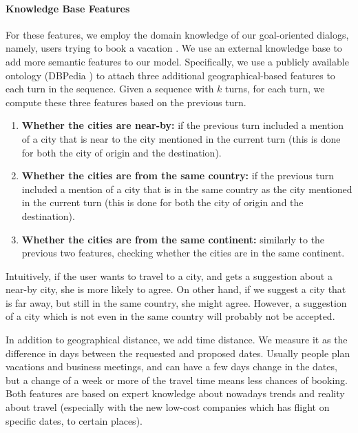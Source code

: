 \paragraph*{Knowledge Base Features}\label{sec:kb}
For these features, we employ the domain knowledge of our goal-oriented dialogs, 
namely, users trying to book a vacation \cite{frames}. 
We use an external knowledge base to add more semantic features to our model. 
Specifically, we use a publicly available ontology (DBPedia \cite{dbpedia}) 
to attach three additional geographical-based features to each turn in the sequence. 
Given a sequence with $k$ turns, for each turn, we compute these three features 
based on the previous turn. 

\begin{enumerate}
\item {\bf Whether the cities are near-by: } if the previous turn included a mention of a city that is near to the city mentioned in the current turn (this is done for both the city of origin and the destination).
\item {\bf Whether the cities are from the same country: } if the previous turn included a mention of a city that is in the same country as the city mentioned in the current turn (this is done for both the city of origin and the destination).
\item {\bf Whether the cities are from the same continent: } similarly to the previous two features, checking whether the cities are in the same continent.
\end{enumerate}

Intuitively, if the user wants to travel to a city, 
and gets a suggestion about a near-by city, 
she is more likely to agree. 
On other hand, if we suggest a city that is far away, 
but still in the same country, she might agree. 
However, a suggestion of a city which is not even 
in the same country will probably not be accepted. 

In addition to geographical distance, we add time distance. 
We measure it as the difference in days between the requested and proposed dates. 
Usually people plan vacations and business meetings, and can have a few days change in the dates, 
but a change of a week or more of the travel time means less chances of booking.
Both features are based on expert knowledge about nowadays trends and reality about travel (especially with the new low-cost companies which has flight on specific dates, to certain places). 

